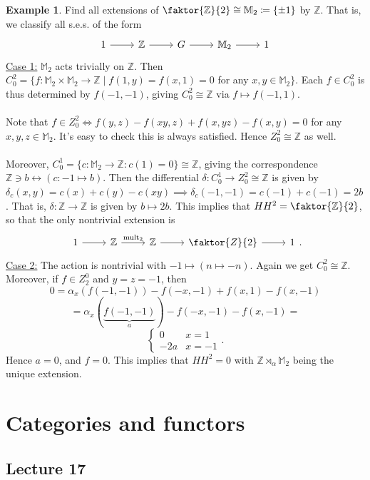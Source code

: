 \documentclass[10pt,letterpaper,cm]{nupset}
\theoremstyle{definition}
\newtheorem{exmp}{Example}
\newcommand{\M}{\mathbb M}
\newcommand{\Z}{\mathbb Z}
\newcommand{\1}{\mathbf{1}}
\newcommand{\0}{\vec 0}
\begin{document}
\begin{exmp}
Find all extensions of $\faktor{\Z}{2}\cong \M_2 \coloneqq  \{\pm1\}$ by $\Z$. That is, we classify all s.e.s. of the form
\[
\begin{tikzcd}
1 \arrow[r] & \Z \arrow[r] & G \arrow[r] & \M_2 \arrow[r] & 1
\end{tikzcd}
\]
\underline{Case 1:} $\M_2$ acts trivially on $\Z$. Then $C^2_0 = \{f : \M_2 \times \M_2 \to \Z \mid f(1, y) = f(x, 1) = 0$ for any $x,y \in \M_2 \}$. Each $f \in C^2_0$ is thus determined by $f(-1, -1)$, giving $C^2_0 \cong \Z$ via $f\mapsto f(-1, 1)$.
\\ \\ Note that $f\in Z^2_0 \iff f(y, z)-f(xy, z)+f(x, yz)-f(x, y) =0$ for any $x, y, z\in \M_2$. It's easy to check this is always satisfied. Hence $Z^2_0 \cong \Z$ as well. 
\\ \\ Moreover, $C^1_0 = \{c : \M_2 \to \Z : c(1) =0\} \cong \Z$, giving the correspondence $\Z \ni b \longleftrightarrow (c: -1 \mapsto b)$. Then the differential $\delta : C^1_0 \to Z^2_0\cong \Z$ is given by $\delta_c(x, y) = c(x)+c(y) -c(xy)\implies \delta_c(-1, -1) = c(-1) + c(-1) = 2b$. That is, $\delta : \Z \to \Z$ is given by $b \mapsto 2b$. This implies that $HH^2 = \faktor{\Z}{2}$, so that the only nontrivial extension is
\[
\begin{tikzcd}
1 \arrow[r] & \Z \arrow[r, "\text{mult}_2"] & \Z \arrow[r] & \faktor{Z}{2} \arrow[r] & 1
\end{tikzcd}.
\]
\underline{Case 2:} The action is nontrivial with $-1 \mapsto (n \mapsto -n)$.  Again we get $C^2_0 \cong \Z$. Moreover, if $f\in Z_2^0$ and $y= z = -1$, then $$0 = \alpha_x(f(-1, -1)) - f(-x, -1)+ f(x, 1)- f(x, -1)$$ $$= \alpha_x(\underbrace{f(-1, -1)}_a) - f(-x, -1)- f(x, -1) = $$
\[
\begin{cases}
0 & x =1 \\
-2a & x = -1
\end{cases}.
\]
Hence $a = 0$, and $f = 0$. This implies that $HH^2 = 0$ with $\Z \rtimes_{\alpha} \M_2$ being the unique extension. 
\end{exmp}

\section{Categories and functors}

\subsection{Lecture 17}
\end{document}
